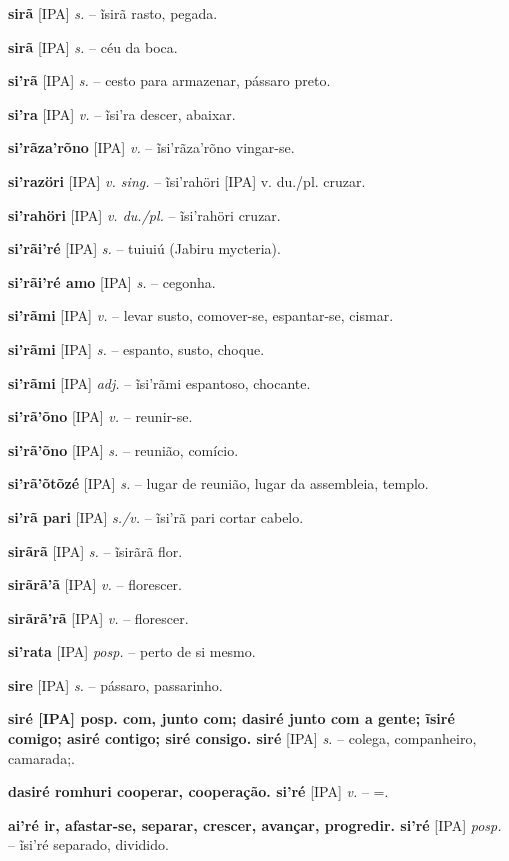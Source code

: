 \textbf{sirã} [IPA] \textit{s.} -- ĩsirã rasto, pegada.

\textbf{sirã} [IPA] \textit{s.} -- céu da boca.

\textbf{si'rã} [IPA] \textit{s.} -- cesto para armazenar, pássaro preto.

\textbf{si'ra} [IPA] \textit{v.} -- ĩsi'ra descer, abaixar.

\textbf{si'rãza'rõno} [IPA] \textit{v.} -- ĩsi'rãza'rõno vingar-se.

\textbf{si'razöri} [IPA] \textit{v. sing.} -- ĩsi'rahöri [IPA] v. du./pl. cruzar.

\textbf{si'rahöri} [IPA] \textit{v. du./pl.} -- ĩsi'rahöri cruzar.

\textbf{si'rãi'ré} [IPA] \textit{s.} -- tuiuiú (Jabiru mycteria).

\textbf{si'rãi'ré amo} [IPA] \textit{s.} -- cegonha.

\textbf{si'rãmi} [IPA] \textit{v.} -- levar susto, comover-se, espantar-se, cismar.

\textbf{si'rãmi} [IPA] \textit{s.} -- espanto, susto, choque.

\textbf{si'rãmi} [IPA] \textit{adj.} -- ĩsi'rãmi espantoso, chocante.

\textbf{si'rã'õno} [IPA] \textit{v.} -- reunir-se.

\textbf{si'rã'õno} [IPA] \textit{s.} -- reunião, comício.

\textbf{si'rã'õtõzé} [IPA] \textit{s.} -- lugar de reunião, lugar da assembleia, templo.

\textbf{si'rã pari} [IPA] \textit{s./v.} -- ĩsi'rã pari cortar cabelo.

\textbf{sirãrã} [IPA] \textit{s.} -- ĩsirãrã flor.

\textbf{sirãrã'ã} [IPA] \textit{v.} -- florescer.

\textbf{sirãrã'rã} [IPA] \textit{v.} -- florescer.

\textbf{si'rata} [IPA] \textit{posp.} -- perto de si mesmo.

\textbf{sire} [IPA] \textit{s.} -- pássaro, passarinho.

\textbf{siré [IPA] posp. com, junto com; dasiré junto com a gente; ĩsiré comigo; asiré contigo; siré consigo. siré} [IPA] \textit{s.} -- colega, companheiro, camarada;.

\textbf{dasiré romhuri cooperar, cooperação. si'ré} [IPA] \textit{v.} -- =.

\textbf{ai'ré ir, afastar-se, separar, crescer, avançar, progredir. si'ré} [IPA] \textit{posp.} -- ĩsi'ré separado, dividido.

